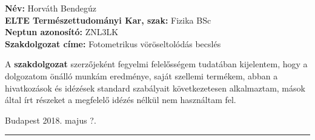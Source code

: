 \documentclass[12pt,letterpaper,twoside,openright]{book}
\begin{document}
\noindent
\textbf{Név:} Horváth Bendegúz
\\
\textbf{ELTE Természettudományi Kar, szak:} Fizika BSc
\\
\textbf{Neptun azonosító:} ZNL3LK\\
\textbf{Szakdolgozat címe:} Fotometrikus vöröseltolódás becslés
\vspace*{2cm}    

A    \textbf{szakdolgozat}   szerzőjeként    fegyelmi
felelősségem  tudatában kijelentem,  hogy a  dolgozatom  önálló munkám
eredménye, saját  szellemi termékem, abban a  hivatkozások és idézések
standard  szabályait  következetesen   alkalmaztam,  mások  által  írt
részeket a megfelelő idézés nélkül nem használtam fel.

\vspace*{2cm}
Budapest 2018. majus ?.
\\
\hspace*{8 cm}\rule{5cm}{0.5pt}
\end{document}
